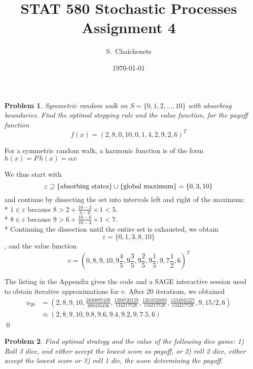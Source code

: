 \documentclass[aps,prl,twocolumn,floatfix,letterpaper]{revtex4}
\newtheorem{problem}{Problem}
\newenvironment{solution}[1][Solution]{\begin{trivlist}
    \item[\hskip \labelsep {\bfseries #1}]}{\end{trivlist}}
\begin{document}
\title{STAT 580 Stochastic Processes \\
	Assignment 4}
\author{ S.\ Chaichenets }
\date{\today}
\maketitle



\begin{problem}
Symmetric random walk on $S=\{0,1,2,\ldots,10\}$ with absorbing boundaries.
Find the optimal stopping rule and the value function, for the payoff function
$$
	f(x) = (2,8,0,10,0,1,4,2,9,2,6)^T
$$
\end{problem}

\begin{solution}
For a symmetric random walk, a harmonic function is of the
form $h(x) = P\,h(x) = \alpha x$ %

We thus start with $$\varepsilon \supseteq \{ {\rm absorbing\ states} \} \cup \{ {\rm global\ maximum}\} = \{0,3,10\}$$
and continue by dissecting the set into intervals left and right of the maximum: \\*
${1} \in \varepsilon $ because $ 8 > 2 + \frac{10-2}{3-0}\times1 < 5$.\\*
${8} \in \varepsilon $ because $ 9 > 6 + \frac{10-6}{10-3}\times1 < 7$. \\*
Continuing the dissection until the entire set is exhausted, we obtain
$$\varepsilon=\{0,1,3,8,10\}$$, and the value function
$$
v = (0,8,9,10,9\frac{4}{5},9\frac{3}{5},9\frac{2}{5},9\frac{1}{5},9,7\frac{1}{2},6)^T
$$

The listing in the Appendix gives the code and a {\rm SAGE} interactive session used to obtain 
iterative approximations for $v$. After 20 iterations, we obtained
\tiny
\begin{equation}
\begin{split}
u_{20} &= 
(2, 8, 9, 10, \frac{2630897439}{268435456}, \frac{1288720159}{134217728},
\frac{1261832693}{134217728}, \frac{1234945227}{134217728}, 9, 15/2, 6) \\
&\approx 
(2, 8, 9, 10, 9.8, 9.6, 9.4, 9.2, 9, 7.5, 6)
\end{split}
\end{equation}
\normalsize
\qed
\end{solution}

\begin{problem}
Find optimal strategy and the value of the following dice game:
1) Roll 3 dice, and either accept the lowest score as payoff, or
2) roll 2 dice, either accept the lowest score or
3) roll 1 die, the score determining the payoff.
\end{problem}
\end{document}
